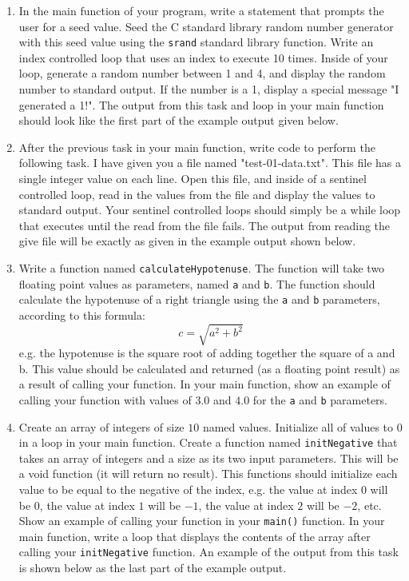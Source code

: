 \documentclass[11pt]{article}
\begin{document}
\begin{enumerate}
\item In the main function of your program, write a statement that
prompts the user for a seed value.  Seed the C standard library
random number generator with this seed value using the \verb~srand~
standard library function.  Write an index controlled loop that
uses an index to execute 10 times.  Inside of your loop, generate a
random number between 1 and 4, and display the random number to
standard output.  If the number is a 1, display a special message
"I generated a 1!".  The output from this task and loop in your
main function should look like the first part of the example
output given below.

\item After the previous task in your main function, write code to
perform the following task.  I have given you a file named
"test-01-data.txt".  This file has a single integer value on each
line.  Open this file, and inside of a sentinel controlled loop,
read in the values from the file and display the values to standard
output.  Your sentinel controlled loops should simply be a while
loop that executes until the read from the file fails.  The output
from reading the give file will be exactly as given in the example
output shown below.

\item Write a function named \verb~calculateHypotenuse~.  The function will
take two floating point values as parameters, named \verb~a~ and \verb~b~.
The function should calculate the hypotenuse of a right triangle
using the \verb~a~ and \verb~b~ parameters, according to this formula: $$ c =
   \sqrt{a^2 + b^2} $$ e.g. the hypotenuse is the square root of
adding together the square of a and b.  This value should be
calculated and returned (as a floating point result) as a result of
calling your function.  In your main function, show an example of
calling your function with values of $3.0$ and $4.0$ for the \verb~a~
and \verb~b~ parameters.

\item Create an array of integers of size $10$ named values.  Initialize
all of values to $0$ in a loop in your main function.  Create a
function named \verb~initNegative~ that takes an array of integers and a
size as its two input parameters.  This will be a void function (it
will return no result).  This functions should initialize each
value to be equal to the negative of the index, e.g. the value at
index $0$ will be $0$, the value at index $1$ will be $-1$, the
value at index $2$ will be $-2$, etc.  Show an example of calling
your function in your \verb~main()~ function.  In your main function,
write a loop that displays the contents of the array after calling
your \verb~initNegative~ function.  An example of the output from this
task is shown below as the last part of the example output.
\end{enumerate}
\end{document}
